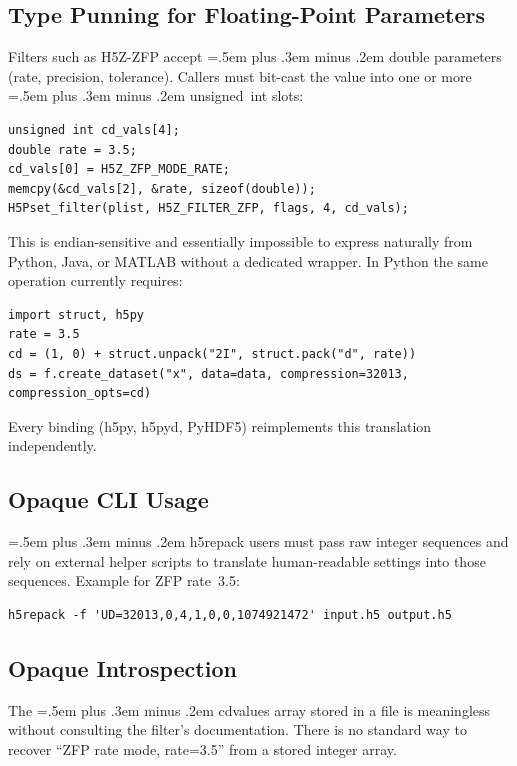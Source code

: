 \documentclass[letterpaper,hyper]{HDF5_RFC}
\renewcommand{\texttt}[1]{\begingroup\small\ttfamily\hyphenchar\font=45
  \spaceskip=.5em plus .3em minus .2em #1\endgroup}
\renewcommand{\_}{\oldtextunderscore\allowbreak}
\begin{document}
\subsection{Type Punning for Floating-Point Parameters}

Filters such as H5Z-ZFP accept \texttt{double} parameters (rate, precision,
tolerance). Callers must bit-cast the value into one or more
\texttt{unsigned~int} slots:

\begin{verbatim}
unsigned int cd_vals[4];
double rate = 3.5;
cd_vals[0] = H5Z_ZFP_MODE_RATE;
memcpy(&cd_vals[2], &rate, sizeof(double));
H5Pset_filter(plist, H5Z_FILTER_ZFP, flags, 4, cd_vals);
\end{verbatim}

This is endian-sensitive and essentially impossible to express naturally from
Python, Java, or MATLAB without a dedicated wrapper. In Python the same
operation currently requires:

\begin{verbatim}
import struct, h5py
rate = 3.5
cd = (1, 0) + struct.unpack("2I", struct.pack("d", rate))
ds = f.create_dataset("x", data=data, compression=32013, compression_opts=cd)
\end{verbatim}

Every binding (h5py, h5pyd, PyHDF5) reimplements this translation
independently.

\subsection{Opaque CLI Usage}

\texttt{h5repack} users must pass raw integer sequences and rely on external
helper scripts to translate human-readable settings into those sequences.
Example for ZFP rate~3.5:

\begin{verbatim}
h5repack -f 'UD=32013,0,4,1,0,0,1074921472' input.h5 output.h5
\end{verbatim}

\subsection{Opaque Introspection}

The \texttt{cd\_values} array stored in a file is meaningless without
consulting the filter's documentation. There is no standard way to recover
``ZFP rate mode, rate=3.5'' from a stored integer array.
\end{document}
